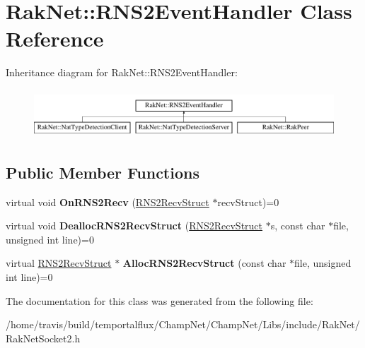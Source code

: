 \hypertarget{class_rak_net_1_1_r_n_s2_event_handler}{\section{Rak\-Net\-:\-:R\-N\-S2\-Event\-Handler Class Reference}
\label{class_rak_net_1_1_r_n_s2_event_handler}
}
Inheritance diagram for Rak\-Net\-:\-:R\-N\-S2\-Event\-Handler\-:\begin{figure}[H]
\begin{center}
\leavevmode
\includegraphics[height=1.821138cm]{class_rak_net_1_1_r_n_s2_event_handler}
\end{center}
\end{figure}
\subsection*{Public Member Functions}
\begin{DoxyCompactItemize}
\item 
\hypertarget{class_rak_net_1_1_r_n_s2_event_handler_adf16fd359f7eaae43a408546f0748db1}{virtual void {\bfseries On\-R\-N\-S2\-Recv} (\hyperlink{struct_rak_net_1_1_r_n_s2_recv_struct}{R\-N\-S2\-Recv\-Struct} $\ast$recv\-Struct)=0}\label{class_rak_net_1_1_r_n_s2_event_handler_adf16fd359f7eaae43a408546f0748db1}

\item 
\hypertarget{class_rak_net_1_1_r_n_s2_event_handler_aeb3c1d15c42986f0229a4876748b3697}{virtual void {\bfseries Dealloc\-R\-N\-S2\-Recv\-Struct} (\hyperlink{struct_rak_net_1_1_r_n_s2_recv_struct}{R\-N\-S2\-Recv\-Struct} $\ast$s, const char $\ast$file, unsigned int line)=0}\label{class_rak_net_1_1_r_n_s2_event_handler_aeb3c1d15c42986f0229a4876748b3697}

\item 
\hypertarget{class_rak_net_1_1_r_n_s2_event_handler_ad99704ffdc3a73fe7dbd9dfc1fbc9969}{virtual \hyperlink{struct_rak_net_1_1_r_n_s2_recv_struct}{R\-N\-S2\-Recv\-Struct} $\ast$ {\bfseries Alloc\-R\-N\-S2\-Recv\-Struct} (const char $\ast$file, unsigned int line)=0}\label{class_rak_net_1_1_r_n_s2_event_handler_ad99704ffdc3a73fe7dbd9dfc1fbc9969}

\end{DoxyCompactItemize}


The documentation for this class was generated from the following file\-:\begin{DoxyCompactItemize}
\item 
/home/travis/build/temportalflux/\-Champ\-Net/\-Champ\-Net/\-Libs/include/\-Rak\-Net/Rak\-Net\-Socket2.\-h\end{DoxyCompactItemize}
